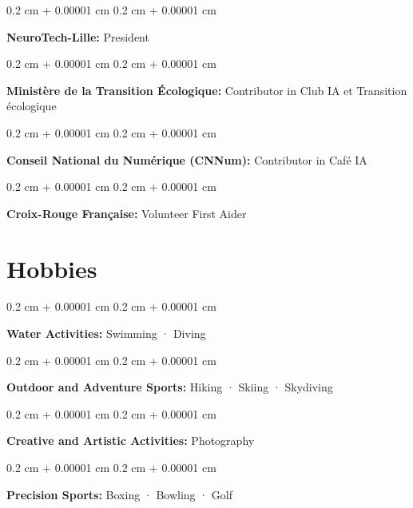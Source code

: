 \documentclass[10pt, letterpaper]{article}
\newenvironment{onecolentry}{
    \begin{adjustwidth}{
        0.2 cm + 0.00001 cm
    }{
        0.2 cm + 0.00001 cm
    }
}{
    \end{adjustwidth}
} %
\begin{document}
    \begin{onecolentry}
        \textbf{NeuroTech-Lille:} President
    \end{onecolentry}
    \vspace{0.2 cm}

    \begin{onecolentry}
        \textbf{Ministère de la Transition Écologique:} Contributor in Club IA et Transition écologique
    \end{onecolentry}
    \vspace{0.2 cm}

    \begin{onecolentry}
        \textbf{Conseil National du Numérique (CNNum):} Contributor in Café IA
    \end{onecolentry}
    \vspace{0.2 cm}

    \begin{onecolentry}
        \textbf{Croix-Rouge Française:} Volunteer First Aider
    \end{onecolentry}

    \section{Hobbies}
        \begin{onecolentry}
            \textbf{Water Activities:} Swimming · Diving
        \end{onecolentry}
        \vspace{0.2 cm}

        \begin{onecolentry}
            \textbf{Outdoor and Adventure Sports:} Hiking · Skiing · Skydiving
        \end{onecolentry}
        \vspace{0.2 cm}
        
        \begin{onecolentry}
            \textbf{Creative and Artistic Activities:} Photography
        \end{onecolentry}
        \vspace{0.2 cm}

        \begin{onecolentry}
            \textbf{Precision Sports:} Boxing · Bowling · Golf
        \end{onecolentry}
        \vspace{0.2 cm}


\end{document}
